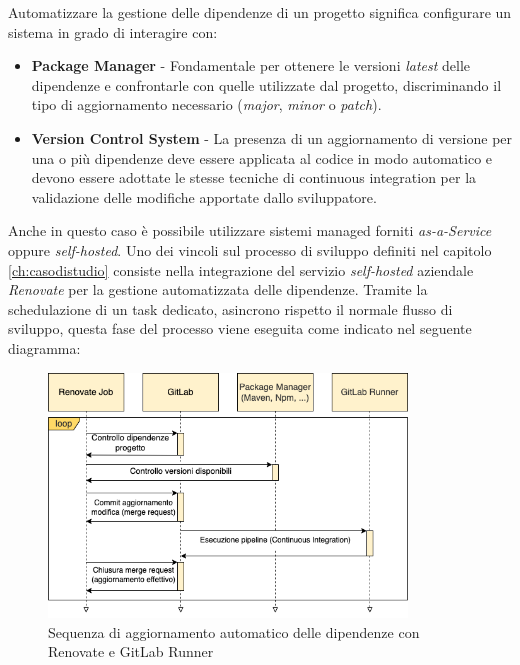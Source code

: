 Automatizzare la gestione delle dipendenze di un progetto significa configurare un sistema in grado di interagire con:

\begin{itemize}
    \item \textbf{Package Manager} - Fondamentale per ottenere le versioni \textit{latest} delle dipendenze e confrontarle con quelle utilizzate dal progetto, discriminando il tipo di aggiornamento necessario (\textit{major}, \textit{minor} o \textit{patch}).
    \item \textbf{Version Control System} - La presenza di un aggiornamento di versione per una o più dipendenze deve essere applicata al codice in modo automatico e devono essere adottate le stesse tecniche di continuous integration per la validazione delle modifiche apportate dallo sviluppatore.
\end{itemize}

Anche in questo caso è possibile utilizzare sistemi managed forniti \textit{as-a-Service} oppure \textit{self-hosted}. Uno dei vincoli sul processo di sviluppo definiti nel capitolo \ref{ch:casodistudio} consiste nella integrazione del servizio \textit{self-hosted} aziendale \textit{Renovate} per la gestione automatizzata delle dipendenze. Tramite la schedulazione di un task dedicato, asincrono rispetto il normale flusso di sviluppo, questa fase del processo viene eseguita come indicato nel seguente diagramma:

\begin{figure}[H]
    \centering
    \includegraphics[width=0.85\textwidth]{img/renovate-uml-sequenza.png}
    \caption{Sequenza di aggiornamento automatico delle dipendenze con Renovate e GitLab Runner}
    \label{renovaflow}
\end{figure}

